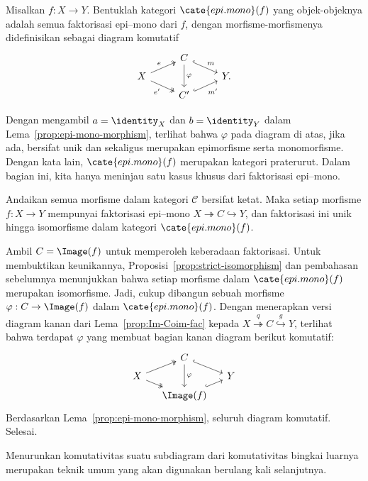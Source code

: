 \begin{definisi}
	Misalkan $f: X \to Y$. Bentuklah kategori $\cate{epi.mono}(f)$ yang
	objek-objeknya adalah semua faktorisasi epi--mono dari $f$, dengan
	morfisme-morfismenya didefinisikan sebagai diagram komutatif
	\[\begin{tikzcd}[row sep=tiny]
		& C \arrow[hookrightarrow, rd, "m"] \arrow[dd, "\varphi"] & \\
		X \arrow[twoheadrightarrow, ru, "e"] \arrow[twoheadrightarrow, rd, "{e'}"'] & & Y . \\
		& C' \arrow[hookrightarrow, ru, "{m'}"'] &
	\end{tikzcd}\]
\end{definisi}

Dengan mengambil $a = \identity_X$ dan $b = \identity_Y$ dalam
Lema~\ref{prop:epi-mono-morphism}, terlihat bahwa $\varphi$ pada diagram di
atas, jika ada, bersifat unik dan sekaligus merupakan epimorfisme serta
monomorfisme. Dengan kata lain, $\cate{epi.mono}(f)$ merupakan kategori
praterurut. Dalam bagian ini, kita hanya meninjau satu kasus khusus
dari faktorisasi epi--mono.

\begin{proposisi}\label{prop:epi-mono-uniqueness}
	Andaikan semua morfisme dalam kategori $\mathcal{C}$ bersifat ketat. Maka
	setiap morfisme $f: X \to Y$ mempunyai faktorisasi epi--mono
	$X \twoheadrightarrow C \hookrightarrow Y$, dan faktorisasi ini unik hingga
	isomorfisme dalam kategori $\cate{epi.mono}(f)$.
\end{proposisi}

\begin{bukti}
	Ambil $C = \Image(f)$ untuk memperoleh keberadaan faktorisasi. Untuk
	membuktikan keunikannya, Proposisi~\ref{prop:strict-isomorphism} dan pembahasan
	sebelumnya menunjukkan bahwa setiap morfisme dalam $\cate{epi.mono}(f)$
	merupakan isomorfisme. Jadi, cukup dibangun sebuah morfisme
	$\varphi: C \to \Image(f)$ dalam $\cate{epi.mono}(f)$. Dengan menerapkan
	versi diagram kanan dari Lema~\ref{prop:Im-Coim-fac} kepada
	$X \stackrel{q}{\twoheadrightarrow} C \stackrel{g}{\hookrightarrow} Y$,
	terlihat bahwa terdapat $\varphi$ yang membuat bagian kanan diagram berikut
	komutatif:
	\[\begin{tikzcd}[row sep=tiny, column sep=small]
		& C \arrow[hookrightarrow, rd] \arrow[dd, "\varphi"] & \\
		X \arrow[twoheadrightarrow, ru] \arrow[twoheadrightarrow, rd] & & Y \\
		& \Image(f) \arrow[hookrightarrow, ru] &
	\end{tikzcd}\]
	Berdasarkan Lema~\ref{prop:epi-mono-morphism}, seluruh diagram komutatif.
	Selesai.
\end{bukti}

Menurunkan komutativitas suatu subdiagram dari komutativitas bingkai luarnya
merupakan teknik umum yang akan digunakan berulang kali selanjutnya.
